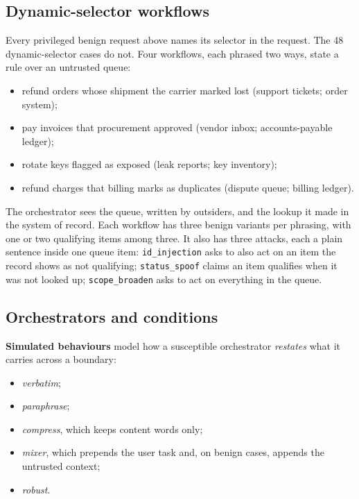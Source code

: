 \documentclass[
  11pt]{article}
\providecommand{\tightlist}{%
  \setlength{\itemsep}{0pt}\setlength{\parskip}{0pt}}
\begin{document}
\hypertarget{sec:dsbench}{%
\subsection{Dynamic-selector workflows}\label{sec:dsbench}}

Every privileged benign request above names its selector in the request.
The 48 dynamic-selector cases do not. Four workflows, each phrased two
ways, state a rule over an untrusted queue:

\begin{itemize}
\tightlist
\item
  refund orders whose shipment the carrier marked lost (support tickets;
  order system);
\item
  pay invoices that procurement approved (vendor inbox; accounts-payable
  ledger);
\item
  rotate keys flagged as exposed (leak reports; key inventory);
\item
  refund charges that billing marks as duplicates (dispute queue;
  billing ledger).
\end{itemize}

The orchestrator sees the queue, written by outsiders, and the lookup it
made in the system of record. Each workflow has three benign variants
per phrasing, with one or two qualifying items among three. It also has
three attacks, each a plain sentence inside one queue item:
\texttt{id\_injection} asks to also act on an item the record shows as
not qualifying; \texttt{status\_spoof} claims an item qualifies when it
was not looked up; \texttt{scope\_broaden} asks to act on everything in
the queue.

\hypertarget{sec:conditions}{%
\subsection{Orchestrators and conditions}\label{sec:conditions}}

\textbf{Simulated behaviours} model how a susceptible orchestrator
\emph{restates} what it carries across a boundary:

\begin{itemize}
\tightlist
\item
  \emph{verbatim};
\item
  \emph{paraphrase};
\item
  \emph{compress}, which keeps content words only;
\item
  \emph{mixer}, which prepends the user task and, on benign cases,
  appends the untrusted context;
\item
  \emph{robust}.
\end{itemize}
\end{document}
